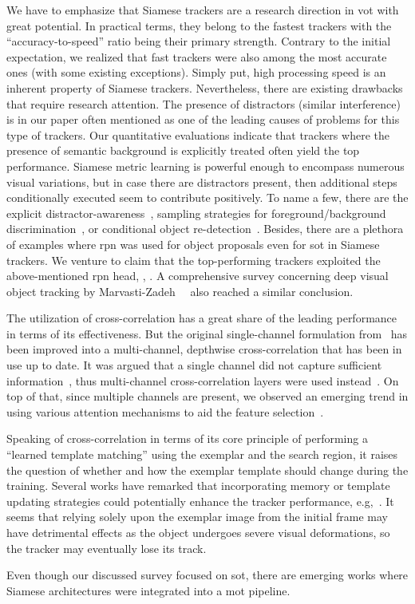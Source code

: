 We have to emphasize that Siamese trackers are a research direction in \gls{vot} with great potential. In practical terms, they belong to the fastest trackers with the ``accuracy-to-speed'' ratio being their primary strength. Contrary to the initial expectation, we realized that fast trackers were also among the most accurate ones (with some existing exceptions). Simply put, high processing speed is an inherent property of Siamese trackers. Nevertheless, there are existing drawbacks that require research attention. The presence of distractors (similar interference) is in our paper often mentioned as one of the leading causes of problems for this type of trackers. Our quantitative evaluations indicate that trackers where the presence of semantic background is explicitly treated often yield the top performance. Siamese metric learning is powerful enough to encompass numerous visual variations, but in case there are distractors present, then additional steps conditionally executed seem to contribute positively. To name a few, there are the explicit distractor-awareness~\cite{zhu2018dasiamrpn}, sampling strategies for foreground/background discrimination~\cite{li2020figsiam}, or conditional object re-detection~\cite{li2019siamrm}. Besides, there are a plethora of examples where \gls{rpn} was used for object proposals even for \gls{sot} in Siamese trackers. We venture to claim that the top-performing trackers exploited the above-mentioned \gls{rpn} head, \egtext{}, \cite{li2018siamrpn, zhu2018dasiamrpn, li2018siamrpnpp}. A comprehensive survey concerning deep visual object tracking by Marvasti-Zadeh~\etal{}~\cite{marvastizadeh2021survey} also reached a similar conclusion.

The utilization of cross-correlation has a great share of the leading performance in terms of its effectiveness. But the original single-channel formulation from~\cite{bertinetto2016siamfc} has been improved into a multi-channel, depthwise cross-correlation that has been in use up to date. It was argued that a single channel did not capture sufficient information~\cite{guo2019siamcar}, thus multi-channel cross-correlation layers were used instead~\cite{li2018siamrpnpp}. On top of that, since multiple channels are present, we observed an emerging trend in using various attention mechanisms to aid the feature selection~\cite{wang2018learningattentions}.

Speaking of cross-correlation in terms of its core principle of performing a ``learned template matching'' using the exemplar and the search region, it raises the question of whether and how the exemplar template should change during the training. Several works have remarked that incorporating memory or template updating strategies could potentially enhance the tracker performance, e.g,~\cite{bertinetto2016siamfc, liang2019lssiam}. It seems that relying solely upon the exemplar image from the initial frame may have detrimental effects as the object undergoes severe visual deformations, so the tracker may eventually lose its track.

Even though our discussed survey focused on \gls{sot}, there are emerging works where Siamese architectures were integrated into a \gls{mot} pipeline.
